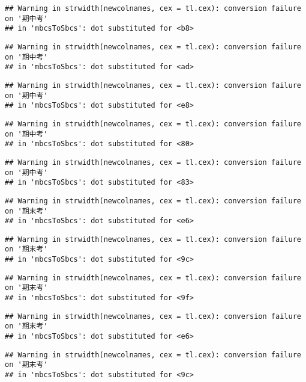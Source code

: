 \documentclass[
]{book}
\begin{document}
\begin{verbatim}
## Warning in strwidth(newcolnames, cex = tl.cex): conversion failure on '期中考'
## in 'mbcsToSbcs': dot substituted for <b8>
\end{verbatim}

\begin{verbatim}
## Warning in strwidth(newcolnames, cex = tl.cex): conversion failure on '期中考'
## in 'mbcsToSbcs': dot substituted for <ad>
\end{verbatim}

\begin{verbatim}
## Warning in strwidth(newcolnames, cex = tl.cex): conversion failure on '期中考'
## in 'mbcsToSbcs': dot substituted for <e8>
\end{verbatim}

\begin{verbatim}
## Warning in strwidth(newcolnames, cex = tl.cex): conversion failure on '期中考'
## in 'mbcsToSbcs': dot substituted for <80>
\end{verbatim}

\begin{verbatim}
## Warning in strwidth(newcolnames, cex = tl.cex): conversion failure on '期中考'
## in 'mbcsToSbcs': dot substituted for <83>
\end{verbatim}

\begin{verbatim}
## Warning in strwidth(newcolnames, cex = tl.cex): conversion failure on '期末考'
## in 'mbcsToSbcs': dot substituted for <e6>
\end{verbatim}

\begin{verbatim}
## Warning in strwidth(newcolnames, cex = tl.cex): conversion failure on '期末考'
## in 'mbcsToSbcs': dot substituted for <9c>
\end{verbatim}

\begin{verbatim}
## Warning in strwidth(newcolnames, cex = tl.cex): conversion failure on '期末考'
## in 'mbcsToSbcs': dot substituted for <9f>
\end{verbatim}

\begin{verbatim}
## Warning in strwidth(newcolnames, cex = tl.cex): conversion failure on '期末考'
## in 'mbcsToSbcs': dot substituted for <e6>
\end{verbatim}

\begin{verbatim}
## Warning in strwidth(newcolnames, cex = tl.cex): conversion failure on '期末考'
## in 'mbcsToSbcs': dot substituted for <9c>
\end{verbatim}
\end{document}
